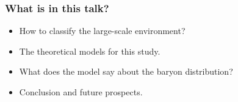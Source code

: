 \documentclass[aspectratio=1610]{beamer}
\begin{document}
\begin{frame}
  \frametitle{What is in this talk?}
  \begin{itemize}
    \item<1-> How to classify the large-scale environment?
    \item<2-> The theoretical models for this study.
    \item<3-> What does the model say about the baryon distribution?
    \item<4-> Conclusion and future prospects.
  \end{itemize}
\end{frame}
\end{document}
